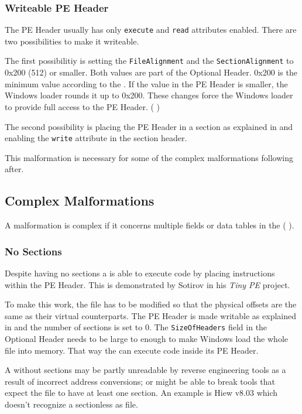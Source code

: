 \subsubsection*{Writeable PE Header} \label{subsubsec:writeableheader}

The PE Header usually has only \texttt{execute} and \texttt{read} attributes enabled. There are two possibilities to make it writeable. 

The first possibilitiy is setting the \texttt{FileAlignment} and the \texttt{SectionAlignment} to 0x200 (512) or smaller. Both values are part of the Optional Header. 0x200 is the minimum value according to the \PECOFF{} \cite[]{pespec}. If the value in the PE Header is smaller, the Windows loader rounds it up to 0x200.
These changes force the Windows loader to provide full access to the PE Header. (\cf{} \cite[]{revlabs11})

The second possibility is placing the PE Header in a section as explained in \emph{} and enabling the \texttt{write} attribute in the section header.

This malformation is necessary for some of the complex malformations following after.

\subsection{Complex Malformations}

A malformation is complex if it concerns multiple fields or data tables in the \PE{} (\cf{} \cite[slide 7]{vuksan11}).

\subsubsection*{No Sections}

Despite having no sections a \PE{} is able to execute code by placing instructions within the PE Header. This is demonstrated by Sotirov in his \emph{Tiny PE} project. \cite{tinype}

To make this work, the file has to be modified so that the physical offsets are the same as their virtual counterparts. The PE Header is made writable as explained in \emph{} and the number of sections is set to 0. The \texttt{SizeOfHeaders} field in the Optional Header needs to be large to enough to make Windows load the whole file into memory. That way the \PE{} can execute code inside its PE Header.

A \PE{} without sections may be partly unreadable by reverse engineering tools as a result of incorrect address conversions; or might be able to break tools that expect the file to have at least one section. An example is Hiew v8.03 which doesn't recognize a sectionless \PE{} as \PE{} file.


